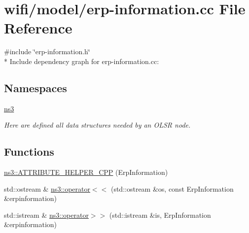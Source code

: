 \hypertarget{erp-information_8cc}{}\section{wifi/model/erp-\/information.cc File Reference}
\label{erp-information_8cc}
{\ttfamily \#include \char`\"{}erp-\/information.\+h\char`\"{}}\\*
Include dependency graph for erp-\/information.cc\+:
\subsection*{Namespaces}
\begin{DoxyCompactItemize}
\item 
 \hyperlink{namespacens3}{ns3}
\begin{DoxyCompactList}\small\item\em Here are defined all data structures needed by an O\+L\+SR node. \end{DoxyCompactList}\end{DoxyCompactItemize}
\subsection*{Functions}
\begin{DoxyCompactItemize}
\item 
\hyperlink{namespacens3_aeba4cd7a94bb1a391cafb015f3dbb181}{ns3\+::\+A\+T\+T\+R\+I\+B\+U\+T\+E\+\_\+\+H\+E\+L\+P\+E\+R\+\_\+\+C\+PP} (Erp\+Information)
\item 
std\+::ostream \& \hyperlink{namespacens3_a73b78fecda4d1cb211d4fec57c7f2586}{ns3\+::operator$<$$<$} (std\+::ostream \&os, const Erp\+Information \&erpinformation)
\item 
std\+::istream \& \hyperlink{namespacens3_ae5b0e28ab565d0454f43cd8f58258b18}{ns3\+::operator$>$$>$} (std\+::istream \&is, Erp\+Information \&erpinformation)
\end{DoxyCompactItemize}
